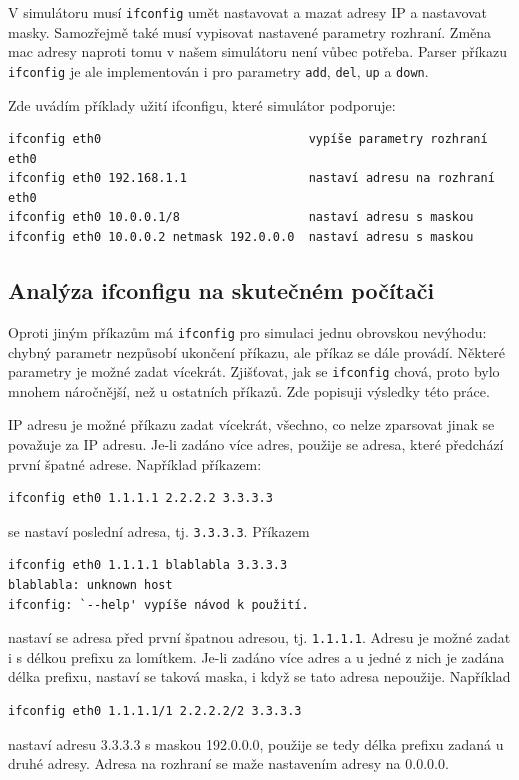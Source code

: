 V simulátoru musí \verb|ifconfig| umět nastavovat a mazat adresy IP a nastavovat masky. Samozřejmě také musí vypisovat nastavené parametry rozhraní. Změna mac adresy naproti tomu v našem simulátoru není vůbec potřeba. Parser příkazu \verb|ifconfig| je ale implementován i pro parametry \verb|add|, \verb|del|, \verb|up| a \verb|down|.

Zde uvádím příklady užití ifconfigu, které simulátor podporuje:
\begin{verbatim}
ifconfig eth0                             vypíše parametry rozhraní eth0
ifconfig eth0 192.168.1.1                 nastaví adresu na rozhraní eth0
ifconfig eth0 10.0.0.1/8                  nastaví adresu s maskou
ifconfig eth0 10.0.0.2 netmask 192.0.0.0  nastaví adresu s maskou
\end{verbatim}


\subsection{Analýza ifconfigu na skutečném počítači}\label{ifconfig_analysa}

Oproti jiným příkazům má \verb|ifconfig| pro simulaci jednu obrovskou nevýhodu: chybný parametr nezpůsobí ukončení příkazu, ale příkaz se dále provádí. Některé parametry je možné zadat vícekrát. Zjišťovat, jak se \verb|ifconfig| chová, proto bylo mnohem náročnější, než u ostatních příkazů. Zde popisuji výsledky této práce.

IP adresu je možné příkazu zadat vícekrát, všechno, co nelze zparsovat jinak se považuje za IP adresu. Je-li zadáno více adres, použije se adresa, které předchází první špatné adrese. Například příkazem:
\begin{verbatim}
ifconfig eth0 1.1.1.1 2.2.2.2 3.3.3.3
\end{verbatim}
se nastaví poslední adresa, tj. \verb|3.3.3.3|. Příkazem
\begin{verbatim}
ifconfig eth0 1.1.1.1 blablabla 3.3.3.3
blablabla: unknown host
ifconfig: `--help' vypíše návod k použití.
\end{verbatim}
nastaví se adresa před první špatnou adresou, tj. \verb|1.1.1.1|. Adresu je možné zadat i s délkou prefixu za lomítkem. Je-li zadáno více adres a u jedné z nich je zadána délka prefixu, nastaví se taková maska, i když se tato adresa nepoužije. Například
\begin{verbatim}ifconfig eth0 1.1.1.1/1 2.2.2.2/2 3.3.3.3\end{verbatim}
nastaví adresu 3.3.3.3 s maskou 192.0.0.0, použije se tedy délka prefixu zadaná u druhé adresy. Adresa na rozhraní se maže nastavením adresy na 0.0.0.0.

